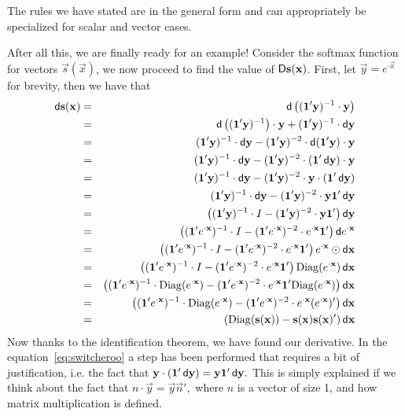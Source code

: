 \documentclass{sapthesis}
\begin{document}
The rules we have stated are in the general form and can appropriately be
specialized for scalar and vector cases.

After all this, we are finally ready for an example! Consider the softmax
function for vectors \(\vec s(\vec x)\), we now proceed to find the value of
\(\mathop{}\!\mathsf D\mathbf{s}(\mathbf{x})\). First, let \(\vec y = e^{{\cdot}\vec x}\)for brevity,
then we have that
\begin{eqnarray}
\dif\vec s(\vec x)
&=& \dif\left((\vec 1' \vec y)^{-1} \cdot \vec y\right)\nonumber\\
&=& \dif\left((\vec 1' \vec y)^{-1}\right) \cdot \vec y
    + (\vec 1' \vec y)^{-1} \cdot \dif\vec y\nonumber\\
&=& (\vec 1' \vec y)^{-1} \cdot \dif\vec y
    - (\vec 1' \vec y)^{-2} \cdot \dif(\vec 1' \vec y) \cdot \vec y\nonumber\\
&=& (\vec 1' \vec y)^{-1} \cdot \dif\vec y
    - (\vec 1' \vec y)^{-2} \cdot (\vec 1' \dif\vec y) \cdot \vec y\nonumber\\
&=& (\vec 1' \vec y)^{-1} \cdot \dif\vec y
    - (\vec 1' \vec y)^{-2} \cdot \vec y \cdot (\vec 1' \dif\vec y)\nonumber\\
&=& (\vec 1' \vec y)^{-1} \cdot \dif\vec y
    - (\vec 1' \vec y)^{-2} \cdot \vec y \vec 1' \dif\vec y\label{eq:switcheroo}\\
&=& \left((\vec 1' \vec y)^{-1} \cdot I
    - (\vec 1' \vec y)^{-2} \cdot \vec y \vec 1'\right) \dif\vec y\nonumber\\
&=& \left((\vec 1' e^{{\cdot}\vec x})^{-1} \cdot I
    - (\vec 1' e^{{\cdot}\vec x})^{-2} \cdot e^{{\cdot}\vec x} \vec 1'\right)
    \dif e^{{\cdot}\vec x}\nonumber\\
&=& \left((\vec 1' e^{{\cdot}\vec x})^{-1} \cdot I
    - (\vec 1' e^{{\cdot}\vec x})^{-2} \cdot e^{{\cdot}\vec x} \vec 1'\right)
    e^{{\cdot}\vec x} \hadam \dif \vec x\nonumber\\
&=& \left((\vec 1' e^{{\cdot}\vec x})^{-1} \cdot I
    - (\vec 1' e^{{\cdot}\vec x})^{-2} \cdot e^{{\cdot}\vec x} \vec 1'\right)
    \Diag(e^{{\cdot}\vec x}) \dif \vec x\nonumber\\
&=& \left((\vec 1' e^{{\cdot}\vec x})^{-1} \cdot \Diag(e^{{\cdot}\vec x})
    - (\vec 1' e^{{\cdot}\vec x})^{-2} \cdot e^{{\cdot}\vec x} \vec 1' \Diag(e^{{\cdot}\vec x})\right)
    \dif \vec x\nonumber\\
&=& \left((\vec 1' e^{{\cdot}\vec x})^{-1} \cdot \Diag(e^{{\cdot}\vec x})
    - (\vec 1' e^{{\cdot}\vec x})^{-2} \cdot e^{{\cdot}\vec x} (e^{{\cdot}\vec x})'\right)
    \dif \vec x\nonumber\\
&=& (\Diag(\vec s(\vec x)) - \vec s(\vec x) \vec s(\vec x)') \dif\vec x\nonumber
\end{eqnarray}
Now thanks to the identification theorem, we have found our derivative.  In the
equation~\ref{eq:switcheroo} a step has been performed that requires a bit of
justification, i.e. the fact that \(\mathbf{y} \cdot (\mathbf{1}' \mathop{}\!\mathsf d\mathbf{y}) = \mathbf{y}
\mathbf{1}' \mathop{}\!\mathsf d\mathbf{y}.\) This is simply explained if we think about the fact that
\(n \cdot \vec y = \vec y \vec n',\) where \(n\) is a vector of size 1, and how
matrix multiplication is defined.
\end{document}
